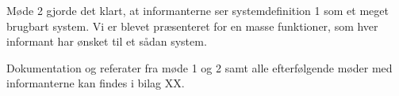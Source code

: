Møde 2 gjorde det klart, at informanterne ser systemdefinition 1 som et meget brugbart system. Vi er blevet præsenteret for en masse funktioner, som hver informant har ønsket til et sådan system.

Dokumentation og referater fra møde 1 og 2 samt alle efterfølgende møder med informanterne kan findes i bilag XX.
